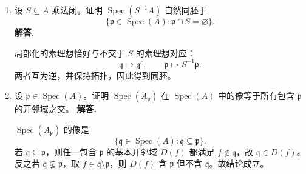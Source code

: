 \documentclass[a4paper]{ctexart}
\begin{document}
\begin{enumerate}[leftmargin=*, label=\textbf{3.\arabic*.}]
\begin{enumerate}[label=(\roman*)]
\item 若 \(M\neq 0\)，取 \(0\neq x\in M\)，再取包含 \(\operatorname{Ann}(x)\) 的极大理想 \(\mathfrak m\)，则 \(x/1\neq 0\in M_{\mathfrak m}\)。反向显然。
\item
\[
(A/\mathfrak a)_{\mathfrak p}=0 \iff \mathfrak a\not\subseteq \mathfrak p,
\]
故支撑正是 \(V(\mathfrak a)\)。
\item 局部化保持正合，因此逐点判断即得。
\item 因为局部化与直和可交换。
\item 由 Proposition 3.14，
\[
\operatorname{Ann}(M_{\mathfrak p})=A_{\mathfrak p}\operatorname{Ann}(M),
\]
故
\[
M_{\mathfrak p}=0 \iff \operatorname{Ann}(M)\not\subseteq \mathfrak p.
\]
\item 对每个 \(\mathfrak p\),
\[
(M\otimes_A N)_{\mathfrak p}\cong M_{\mathfrak p}\otimes_{A_{\mathfrak p}}N_{\mathfrak p}.
\]
若两者都非零且有限生成，则在局部环 \(A_{\mathfrak p}\) 上张量积仍非零。
\item 由
\[
M/\mathfrak aM \cong (A/\mathfrak a)\otimes_A M
\]
以及上一条可得
\[
\operatorname{Supp}(M/\mathfrak aM)=V(\mathfrak a)\cap V(\operatorname{Ann}(M))
=V(\mathfrak a+\operatorname{Ann}(M)).
\]
\end{enumerate}

\setcounter{enumi}{20}
\item 设 \(S\subseteq A\) 乘法闭。证明 \(\operatorname{Spec}(S^{-1}A)\) 自然同胚于
\[
\{\mathfrak p\in \operatorname{Spec}(A):\mathfrak p\cap S=\varnothing\}.
\]
\textbf{解答.}

局部化的素理想恰好与不交于 \(S\) 的素理想对应：
\[
\mathfrak q\longmapsto \mathfrak q^c,\qquad
\mathfrak p\longmapsto S^{-1}\mathfrak p.
\]
两者互为逆，并保持拓扑，因此得到同胚。

\setcounter{enumi}{21}
\item 设 \(\mathfrak p\in\operatorname{Spec}(A)\)。证明 \(\operatorname{Spec}(A_{\mathfrak p})\) 在 \(\operatorname{Spec}(A)\) 中的像等于所有包含 \(\mathfrak p\) 的开邻域之交。
\textbf{解答.}

\(\operatorname{Spec}(A_{\mathfrak p})\) 的像是
\[
\{\mathfrak q\in\operatorname{Spec}(A):\mathfrak q\subseteq \mathfrak p\}.
\]
若 \(\mathfrak q\subseteq \mathfrak p\)，则任一包含 \(\mathfrak p\) 的基本开邻域 \(D(f)\) 都满足 \(f\notin\mathfrak q\)，故 \(\mathfrak q\in D(f)\)。反之若 \(\mathfrak q\not\subseteq \mathfrak p\)，取 \(f\in\mathfrak q\setminus\mathfrak p\)，则 \(D(f)\) 含 \(\mathfrak p\) 但不含 \(\mathfrak q\)。故结论成立。
\end{enumerate}
\end{document}
